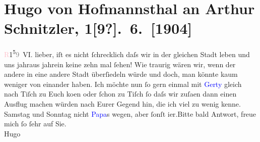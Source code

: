 

               \section[Hugo von Hofmannsthal an Arthur Schnitzler, 1{[}9?{]}. 6. {[}1904{]}]{ Hugo von Hofmannsthal an Arthur Schnitzler, 1{[}9?{]}. 6. {[}1904{]}}\nopagebreak{}\rehead{ }\normalsize\beginnumbering{} \toendnotes[C]{\smallbreak\pagebreak[2]} 
\toendnotes[C]{\smallbreak}\pstart
           \raggedleft{}\textcolor{pink}{R}{}\ledrightnote{\textcolor{pink}{Rodaun}}{ }1\substVorne{}\textsuperscript{5}\substDazwischen{}\textcolor{gray}{9}\substHinten{} VI.\pend
           \pstart
           {\pb}lieber, iſt es nicht ſchrecklich daſs wir in der gleichen Stadt
               leben und uns jahraus jahrein keine zehn mal ſehen!\pend
           \pstart
           Wie traurig wären wir, wenn der andere in eine andere Stadt überſiedeln würde und
               doch, man könnte kaum weniger von einander haben.\pend
           \pstart
           Ich möchte nun ſo gern einmal {\pb}mit
                  \textcolor{blue}{Gerty}{}\ledrightnote{\textcolor{blue}{Gertrude von Hofmannsthal}} gleich nach Tiſch zu Euch ko{\geminationm}en oder ſchon zu Tiſch ſo daſs wir zuſa{\geminationm}en dann einen Ausflug machen würden nach Eurer Gegend
               hin, die ich viel zu wenig kenne.\pend
           \pstart
           Samstag und Sonntag nicht \textcolor{blue}{Papa}{}s wegen, aber ſonſt i{\geminationm}er.\hspace*{1.5em}Bitte bald Antwort, freue mich ſo ſehr auf Sie.{\\}\spacefill\mbox{Hugo}\pend
